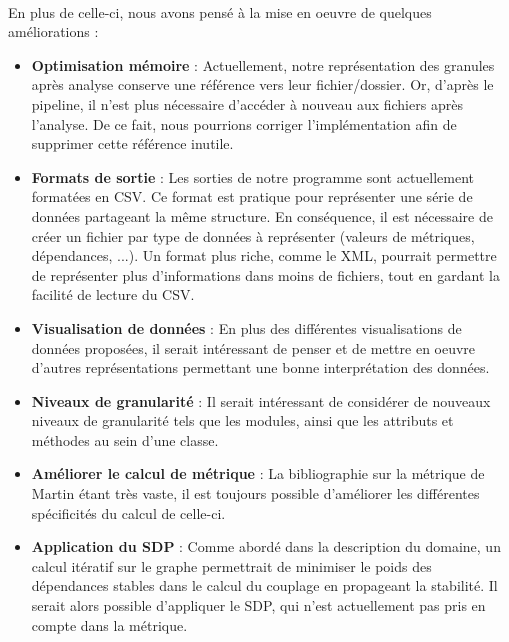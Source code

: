 \documentclass{scrartcl}
\begin{document}
    \paragraph{}En plus de celle-ci, nous avons pensé à la mise en oeuvre de quelques améliorations :
    \begin{itemize}
    
        \item \textbf{Optimisation mémoire} : Actuellement, notre représentation des granules après analyse conserve une référence vers leur fichier/dossier. Or, d'après le pipeline, il n'est plus nécessaire d'accéder à nouveau aux fichiers après l'analyse. De ce fait, nous pourrions corriger l'implémentation afin de supprimer cette référence inutile.
        
        \item \textbf{Formats de sortie} : Les sorties de notre programme sont actuellement formatées en CSV. Ce format est pratique pour représenter une série de données partageant la même structure. En conséquence, il est nécessaire de créer un fichier par type de données à représenter (valeurs de métriques, dépendances, ...). Un format plus riche, comme le XML, pourrait permettre de représenter plus d'informations dans moins de fichiers, tout en gardant la facilité de lecture du CSV.

        \item \textbf{Visualisation de données} : En plus des différentes visualisations de données proposées, il serait intéressant de penser et de mettre en oeuvre d'autres représentations permettant une bonne interprétation des données.
        
        \item \textbf{Niveaux de granularité} : Il serait intéressant de considérer de nouveaux niveaux de granularité tels que les modules, ainsi que les attributs et méthodes au sein d'une classe.

        \item \textbf{Améliorer le calcul de métrique} : La bibliographie sur la métrique de Martin étant très vaste, il est toujours possible d'améliorer les différentes spécificités du calcul de celle-ci. 
        
        \item \textbf{Application du SDP} : Comme abordé dans la description du domaine, un calcul itératif sur le graphe permettrait de minimiser le poids des dépendances stables dans le calcul du couplage en propageant la stabilité. Il serait alors possible d'appliquer le SDP, qui n'est actuellement pas pris en compte dans la métrique.
        

\end{itemize}
\end{document}
